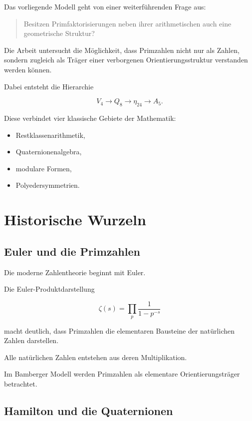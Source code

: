 \documentclass[11pt,a4paper]{article}
\theoremstyle{definition}
\theoremstyle{remark}
\begin{document}
	Das vorliegende Modell geht von einer weiterführenden Frage aus:
	
	\begin{quote}
		Besitzen Primfaktorisierungen neben ihrer arithmetischen
		auch eine geometrische Struktur?
	\end{quote}
	
	Die Arbeit untersucht die Möglichkeit,
	dass Primzahlen nicht nur als Zahlen,
	sondern zugleich als Träger einer verborgenen
	Orientierungsstruktur verstanden werden können.
	
	Dabei entsteht die Hierarchie
	
	\[
	V_4
	\rightarrow
	Q_8
	\rightarrow
	\eta_{24}
	\rightarrow
	A_5.
	\]
	
	Diese verbindet vier klassische Gebiete der Mathematik:
	
	\begin{itemize}
		\item Restklassenarithmetik,
		\item Quaternionenalgebra,
		\item modulare Formen,
		\item Polyedersymmetrien.
	\end{itemize}
	
	
	\section{Historische Wurzeln}
	
	\subsection{Euler und die Primzahlen}
	
	Die moderne Zahlentheorie beginnt mit Euler.
	
	Die Euler-Produktdarstellung
	
	\[
	\zeta(s)
	=
	\prod_p
	\frac{1}{1-p^{-s}}
	\]
	
	macht deutlich,
	dass Primzahlen die elementaren Bausteine
	der natürlichen Zahlen darstellen.
	
	Alle natürlichen Zahlen entstehen aus deren Multiplikation.
	
	Im Bamberger Modell werden Primzahlen
	als elementare Orientierungsträger betrachtet.
	
	\subsection{Hamilton und die Quaternionen}
	
\end{document}
